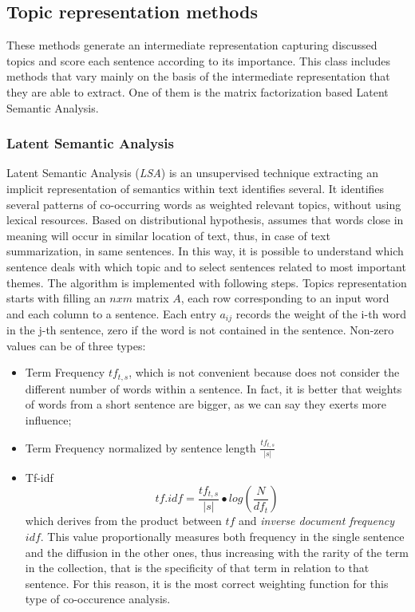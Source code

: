 \documentclass[fleqn,10pt]{SelfArx} %
\begin{document}
\subsection{Topic representation methods}
These methods generate an intermediate representation capturing discussed topics and score each sentence according to its importance. This class includes methods that vary mainly on the basis of the intermediate representation that they are able to extract. One of them is the matrix factorization based Latent Semantic Analysis.
\subsubsection{Latent Semantic Analysis}
Latent Semantic Analysis (\textit{LSA}) is an unsupervised technique extracting an implicit representation of semantics within text identifies several. It identifies several patterns of co-occurring words as weighted relevant topics, without using lexical resources. Based on distributional hypothesis, assumes that words close in meaning will occur in similar location of text, thus, in case of text summarization, in same sentences. In this way, it is possible to understand which sentence deals with which topic and to select sentences related to most important themes.
The algorithm is implemented with following steps. Topics representation starts with filling an $nxm$ matrix $A$, each row corresponding to an input word and each column to a sentence. Each entry $a_{ij}$ records the weight of the i-th word in the j-th sentence, zero if the word is not contained in the sentence. Non-zero values can be of three types:
\begin{itemize}
  \item Term Frequency $tf_{t,s}$, which is not convenient because does not consider the different number of words within a sentence. In fact, it is better that weights of words from a short sentence are bigger, as we can say they exerts more influence;
  \item Term Frequency normalized by sentence length $\frac{tf_{t,s}}{|s|}$
  \item Tf-idf $$tf.idf=\frac{tf_{t,s}}{|s|}\bullet log(\frac{N}{df_t})$$ which derives from the product between $tf$ and \textit{inverse document frequency} $idf$. This value proportionally measures both frequency in the single sentence and the diffusion in the other ones, thus increasing with the rarity of the term in the collection, that is the specificity of that term in relation to that sentence. For this reason, it is the most correct weighting function for this type of co-occurence analysis.  
\end{itemize}
\end{document}
